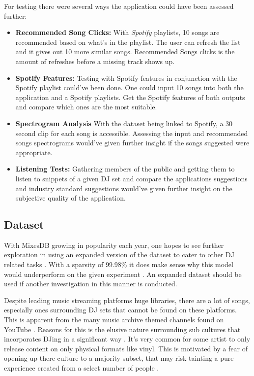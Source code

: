 For testing there were several ways the application could have been assessed further:
\begin{itemize}
	
\item \textbf{Recommended Song Clicks:} With \textit{Spotify} playlists, 10 songs are recommended based on what's in the playlist. The user can refresh the list and it gives out 10 more similar songs. Recommended Songs clicks is the amount of refreshes before a missing track shows up.

\item \textbf{Spotify Features:} Testing with Spotify features in conjunction with the Spotify playlist could've been done. One could input 10 songs into both the  application and a Spotify playlists. Get the Spotify features of both outputs and compare which ones are the most suitable.

\item \textbf{Spectrogram Analysis} With the dataset being linked to Spotify, a 30 second clip for each song is accessible. Assessing the input and recommended songs spectrograms would've given further insight if the songs suggested were appropriate.

\item \textbf{Listening Tests:} Gathering members of the public and getting them to listen to snippets of a given DJ set and compare the applications suggestions and industry standard suggestions would've given further insight on the subjective quality of the application.
\end{itemize}

\subsection{Dataset}
With MixesDB growing in popularity each year, one hopes to see further exploration in using an expanded version of the dataset to cater to other DJ related tasks \citep{similarweb_mixesdbcom_2023}. With a sparsity of 99.98\% it does make sense why this model would underperform on the given experiment \citep{zhang2020alleviating}. An expanded dataset should be used if another investigation in this manner is conducted. 

Despite leading music streaming platforms huge libraries, there are a lot of songs, especially ones surrounding DJ sets that cannot be found on these platforms. This is apparent from the many music archive themed channels found on YouTube \citep{allen_djs_2021}.  Reasons for this is the elusive nature surrounding sub cultures that incorporates DJing in a significant way \citep{reynolds_energy_2013}. It's very common for some artist to only release content on only physical formats like vinyl. This is motivated by a fear of opening up there culture to a majority subset, that may risk tainting a pure experience created from a select number of people \citep{wheeler_gentrification_2020}. 

